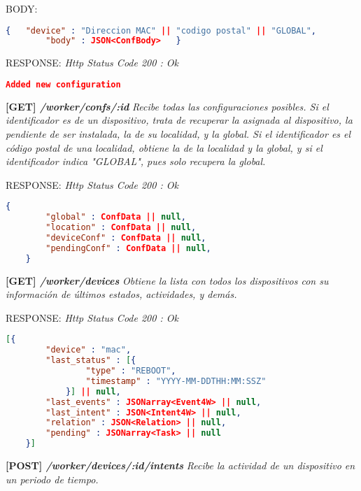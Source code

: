     BODY:
   \begin{lstlisting}[language=json,firstnumber=1]
    {   "device" : "Direccion MAC" || "codigo postal" || "GLOBAL",
        "body" : JSON<ConfBody>   }
    \end{lstlisting} 
    
    RESPONSE: \newline
    \textit{Http Status Code 200 : Ok}
    \begin{lstlisting}[language=json,firstnumber=1]
    Added new configuration
    \end{lstlisting}
\hline \newline

\textbf{[GET] \textit{/worker/confs/:id }}
\textit{Recibe todas las configuraciones posibles. Si el identificador es de un dispositivo, trata de recuperar la asignada al dispositivo, la pendiente de ser instalada, la de su localidad, y la global. Si el identificador es el código postal de una localidad, obtiene la de la localidad y la global, y si el identificador indica "GLOBAL", pues solo recupera la global.}
    
    RESPONSE: \newline
    \textit{Http Status Code 200 : Ok}
    \begin{lstlisting}[language=json,firstnumber=1]
    {
        "global" : ConfData || null,
        "location" : ConfData || null,
        "deviceConf" : ConfData || null,
        "pendingConf" : ConfData || null,
    }
    \end{lstlisting}

\newpage %
\textbf{[GET] \textit{/worker/devices }}
\textit{Obtiene la lista con todos los dispositivos con su información de últimos estados, actividades, y demás.}
    
    RESPONSE: \newline
    \textit{Http Status Code 200 : Ok}
    \begin{lstlisting}[language=json,firstnumber=1]
    [{
        "device" : "mac",
        "last_status" : [{
                "type" : "REBOOT",
                "timestamp" : "YYYY-MM-DDTHH:MM:SSZ"
            }] || null,
        "last_events" : JSONarray<Event4W> || null,
        "last_intent" : JSON<Intent4W> || null,
        "relation" : JSON<Relation> || null,
        "pending" : JSONarray<Task> || null
    }]
    \end{lstlisting}
\hline

\textbf{[POST] \textit{/worker/devices/:id/intents }}
\textit{Recibe la actividad de un dispositivo en un periodo de tiempo.}


